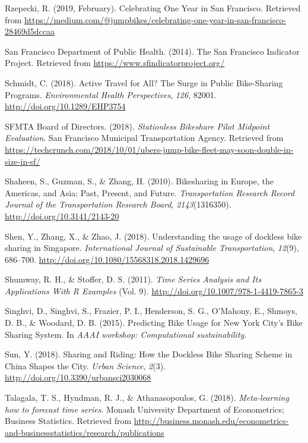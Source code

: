 \documentclass[12pt,oneside]{reedthesis}
\begin{document}
\hypertarget{ref-jump2019}{}
Rzepecki, R. (2019, February). Celebrating One Year in San Francisco.
Retrieved from
\url{https://medium.com/@jumpbikes/celebrating-one-year-in-san-francisco-28469d5dccaa}

\hypertarget{ref-sfindicator}{}
San Francisco Department of Public Health. (2014). The San Francisco
Indicator Project. Retrieved from
\url{https://www.sfindicatorproject.org/}

\hypertarget{ref-schmidt2018}{}
Schmidt, C. (2018). Active Travel for All? The Surge in Public
Bike-Sharing Programs. \emph{Environmental Health Perspectives},
\emph{126}, 82001. \url{http://doi.org/10.1289/EHP3754}

\hypertarget{ref-sfmta2018three}{}
SFMTA Board of Directors. (2018). \emph{Stationless Bikeshare Pilot
Midpoint Evaluation}. San Francisco Municipal Transportation Agency.
Retrieved from
\url{https://techcrunch.com/2018/10/01/ubers-jump-bike-fleet-may-soon-double-in-size-in-sf/}

\hypertarget{ref-shaheen2010}{}
Shaheen, S., Guzman, S., \& Zhang, H. (2010). Bikesharing in Europe, the
Americas, and Asia: Past, Present, and Future. \emph{Transportation
Research Record Journal of the Transportation Research Board},
\emph{2143}(1316350). \url{http://doi.org/10.3141/2143-20}

\hypertarget{ref-shen2018}{}
Shen, Y., Zhang, X., \& Zhao, J. (2018). Understanding the usage of
dockless bike sharing in Singapore. \emph{International Journal of
Sustainable Transportation}, \emph{12}(9), 686--700.
\url{http://doi.org/10.1080/15568318.2018.1429696}

\hypertarget{ref-shumway2011}{}
Shumway, R. H., \& Stoffer, D. S. (2011). \emph{Time Series Analysis and
Its Applications With R Examples} (Vol. 9).
\url{http://doi.org/10.1007/978-1-4419-7865-3}

\hypertarget{ref-singhvi2015}{}
Singhvi, D., Singhvi, S., Frazier, P. I., Henderson, S. G., O'Mahony,
E., Shmoys, D. B., \& Woodard, D. B. (2015). Predicting Bike Usage for
New York City's Bike Sharing System. In \emph{AAAI workshop:
Computational sustainability}.

\hypertarget{ref-sun2018}{}
Sun, Y. (2018). Sharing and Riding: How the Dockless Bike Sharing Scheme
in China Shapes the City. \emph{Urban Science}, \emph{2}(3).
\url{http://doi.org/10.3390/urbansci2030068}

\hypertarget{ref-talagala2018}{}
Talagala, T. S., Hyndman, R. J., \& Athanasopoulos, G. (2018).
\emph{Meta-learning how to forecast time series}. Monash University
Department of Econometrics; Business Statistics. Retrieved from
\url{http://business.monash.edu/econometrics-and-businessstatistics/research/publications}
\end{document}
